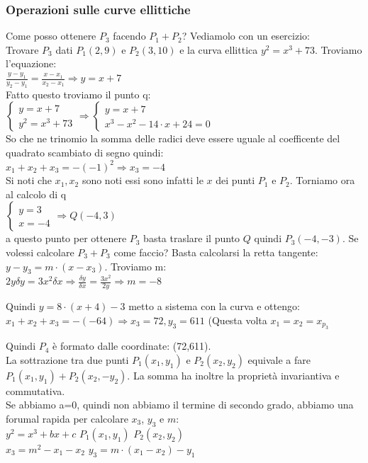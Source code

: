 \documentclass[10pt,a4paper]{article}
\begin{document}
\subsubsection{Operazioni sulle curve ellittiche}
Come posso ottenere $P_3$ facendo $P_1+P_2$? Vediamolo con un esercizio:\\
Trovare $P_3$ dati $P_1(2,9)$ e $P_2(3,10)$ e la curva ellittica $y^2=x^3+73$. Troviamo l'equazione:\\
$\frac{y-y_1}{y_2-y_1}=\frac{x-x_1}{x_2-x_1} \Rightarrow y=x+7$\\
Fatto questo troviamo il punto q:\\
$\begin{cases}
y=x+7 \\
y^2=x^3+73
\end{cases}\Rightarrow
\begin{cases}
y=x+7 \\
x^3-x^2-14\cdot x+24=0
\end{cases}
$\\
So che ne trinomio la somma delle radici deve essere uguale al coefficente del quadrato scambiato di segno quindi:\\
$x_1+x_2+x_3=-(-1)^2 \Rightarrow x_3=-4$\\
Si noti che $x_1,x_2$ sono noti essi sono infatti le $x$ dei punti $P_1$ e $P_2$. Torniamo ora al calcolo di q\\
$\begin{cases}
y=3 \\
x=-4
\end{cases}\Rightarrow Q(-4,3)$\\

a questo punto per ottenere $P_3$ basta traslare il punto $Q$ quindi $P_3(-4,-3)$. Se volessi calcolare $P_3+P_3$ come faccio? Basta calcolarsi la retta tangente: $y-y_3=m\cdot(x-x_3)$. Troviamo m:\\

$2y\delta y=3x^2\delta x \Rightarrow \frac{\delta y}{\delta x} = \frac{3x^2}{2y} \Rightarrow m=-8$

Quindi $y=8\cdot(x+4)-3$ metto a sistema con la curva e ottengo:\\
$x_1+x_2+x_3=-(-64) \Rightarrow x_3=72, y_3=611$ (Questa volta $x_1=x_2=x_{p_3}$

Quindi $P_4$ è formato dalle coordinate: (72,611).\\
La sottrazione tra due punti $P_1(x_1,y_1)$ e $P_2(x_2,y_2)$ equivale a fare $P_1(x_1,y_1)+P_2(x_2,-y_2)$. La somma ha inoltre la proprietà invariantiva e commutativa.\\
Se abbiamo a=0, quindi non abbiamo il termine di secondo grado, abbiamo una forumal rapida per calcolare $x_3$, $y_3$ e $m$:\\
$y^2=x^3+bx+c$ $P_1(x_1,y_1)$ $P_2(x_2,y_2)$\\
$x_3=m^2-x_1-x_2$
$y_3=m\cdot(x_1-x_2)-y_1$
\end{document}
